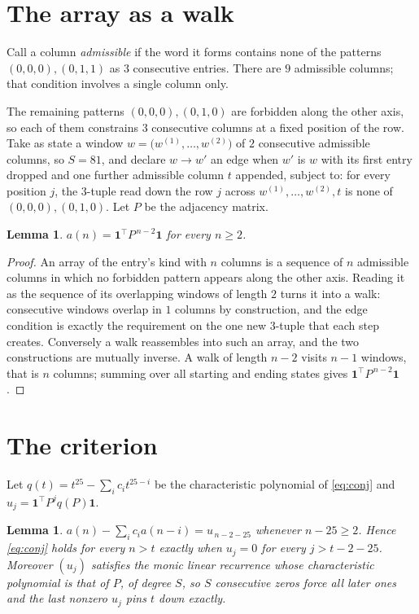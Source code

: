 \documentclass[11pt,a4paper]{article}
\theoremstyle{plain}
\newtheorem{lemma}[theorem]{Lemma}
\theoremstyle{definition}
\begin{document}
\section{The array as a walk}

Call a column \emph{admissible} if the word it forms contains none of the patterns
$(0,0,0), (0,1,1)$ as $3$ consecutive entries. There are $9$ admissible columns; that condition
involves a single column only.

The remaining patterns $(0,0,0), (0,1,0)$ are forbidden along the other axis, so each of them
constrains $3$ consecutive columns at a fixed position of the row. Take as state a
window $w=\bigl(w^{(1)},\dots,w^{(2)}\bigr)$ of $2$ consecutive admissible
columns, so $S=81$, and declare $w\to w'$ an edge when $w'$ is $w$ with its first entry
dropped and one further admissible column $t$ appended, subject to: for every position
$j$, the $3$-tuple read down the row $j$ across $w^{(1)},\dots,w^{(2)},t$
is none of $(0,0,0), (0,1,0)$. Let $P$ be the adjacency matrix.

\begin{lemma}\label{lem:walk}
$a(n)=\mathbf{1}^{\!\top}P^{\,n-2}\mathbf{1}$ for every $n\ge2$.
\end{lemma}

\begin{proof}
An array of the entry's kind with $n$ columns is a sequence of $n$ admissible columns in
which no forbidden pattern appears along the other axis. Reading it as the sequence of its
overlapping windows of length $2$ turns it into a walk: consecutive windows overlap in
$1$ columns by construction, and the edge condition is exactly the requirement on the one
new $3$-tuple that each step creates. Conversely a walk reassembles into such an array,
and the two constructions are mutually inverse. A walk of length $n-2$ visits $n-1$
windows, that is $n$ columns; summing over all starting and ending states gives
$\mathbf{1}^{\!\top}P^{\,n-2}\mathbf{1}$.
\end{proof}

\section{The criterion}

Let $q(t)=t^{25}-\sum_i c_i t^{25-i}$ be the characteristic polynomial of
\eqref{eq:conj} and $u_j=\mathbf{1}^{\!\top}P^{j}q(P)\mathbf{1}$.

\begin{lemma}\label{lem:crit}
$a(n)-\sum_i c_i a(n-i)=u_{\,n-2-25}$ whenever $n-25\ge2$. Hence
\eqref{eq:conj} holds for every $n>t$ exactly when $u_j=0$ for every
$j>t-2-25$. Moreover $(u_j)$ satisfies the monic linear recurrence whose
characteristic polynomial is that of $P$, of degree $S$, so $S$ consecutive zeros force all
later ones and the last nonzero $u_j$ pins $t$ down exactly.
\end{lemma}
\end{document}
